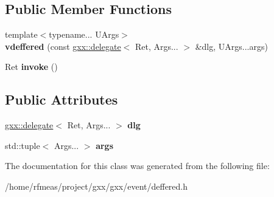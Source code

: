 \subsection*{Public Member Functions}
\begin{DoxyCompactItemize}
\item 
{\footnotesize template$<$typename... U\+Args$>$ }\\{\bfseries vdeffered} (const \hyperlink{classgxx_1_1delegate}{gxx\+::delegate}$<$ Ret, Args... $>$ \&dlg, U\+Args...\+args)\hypertarget{classgxx_1_1vdeffered_acc3ad2ae240c9c14f87602655f31ab18}{}\label{classgxx_1_1vdeffered_acc3ad2ae240c9c14f87602655f31ab18}

\item 
Ret {\bfseries invoke} ()\hypertarget{classgxx_1_1vdeffered_afcd10263127a24619953aa81f9dc3a45}{}\label{classgxx_1_1vdeffered_afcd10263127a24619953aa81f9dc3a45}

\end{DoxyCompactItemize}
\subsection*{Public Attributes}
\begin{DoxyCompactItemize}
\item 
\hyperlink{classgxx_1_1delegate}{gxx\+::delegate}$<$ Ret, Args... $>$ {\bfseries dlg}\hypertarget{classgxx_1_1vdeffered_a7328d90c531b14c15ce7be331c330f9b}{}\label{classgxx_1_1vdeffered_a7328d90c531b14c15ce7be331c330f9b}

\item 
std\+::tuple$<$ Args... $>$ {\bfseries args}\hypertarget{classgxx_1_1vdeffered_abc855676ebf23fcc767e1e16c3c5bbab}{}\label{classgxx_1_1vdeffered_abc855676ebf23fcc767e1e16c3c5bbab}

\end{DoxyCompactItemize}


The documentation for this class was generated from the following file\+:\begin{DoxyCompactItemize}
\item 
/home/rfmeas/project/gxx/gxx/event/deffered.\+h\end{DoxyCompactItemize}
